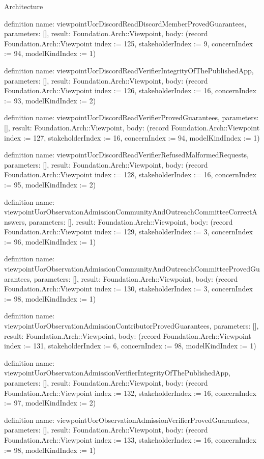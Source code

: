 \begin{lexlean}{Architecture}
\begin{semanticmodule}
definition{
  name: viewpointUorDiscordReadDiscordMemberProvedGuarantees,
  parameters: [],
  result: Foundation.Arch::Viewpoint,
  body: (record Foundation.Arch::Viewpoint {index := 125, stakeholderIndex := 9, concernIndex := 94, modelKindIndex := 1})
}

definition{
  name: viewpointUorDiscordReadVerifierIntegrityOfThePublishedApp,
  parameters: [],
  result: Foundation.Arch::Viewpoint,
  body: (record Foundation.Arch::Viewpoint {index := 126, stakeholderIndex := 16, concernIndex := 93, modelKindIndex := 2})
}

definition{
  name: viewpointUorDiscordReadVerifierProvedGuarantees,
  parameters: [],
  result: Foundation.Arch::Viewpoint,
  body: (record Foundation.Arch::Viewpoint {index := 127, stakeholderIndex := 16, concernIndex := 94, modelKindIndex := 1})
}

definition{
  name: viewpointUorDiscordReadVerifierRefusedMalformedRequests,
  parameters: [],
  result: Foundation.Arch::Viewpoint,
  body: (record Foundation.Arch::Viewpoint {index := 128, stakeholderIndex := 16, concernIndex := 95, modelKindIndex := 2})
}

definition{
  name: viewpointUorObservationAdmissionCommunityAndOutreachCommitteeCorrectAnswers,
  parameters: [],
  result: Foundation.Arch::Viewpoint,
  body: (record Foundation.Arch::Viewpoint {index := 129, stakeholderIndex := 3, concernIndex := 96, modelKindIndex := 1})
}

definition{
  name: viewpointUorObservationAdmissionCommunityAndOutreachCommitteeProvedGuarantees,
  parameters: [],
  result: Foundation.Arch::Viewpoint,
  body: (record Foundation.Arch::Viewpoint {index := 130, stakeholderIndex := 3, concernIndex := 98, modelKindIndex := 1})
}

definition{
  name: viewpointUorObservationAdmissionContributorProvedGuarantees,
  parameters: [],
  result: Foundation.Arch::Viewpoint,
  body: (record Foundation.Arch::Viewpoint {index := 131, stakeholderIndex := 6, concernIndex := 98, modelKindIndex := 1})
}

definition{
  name: viewpointUorObservationAdmissionVerifierIntegrityOfThePublishedApp,
  parameters: [],
  result: Foundation.Arch::Viewpoint,
  body: (record Foundation.Arch::Viewpoint {index := 132, stakeholderIndex := 16, concernIndex := 97, modelKindIndex := 2})
}

definition{
  name: viewpointUorObservationAdmissionVerifierProvedGuarantees,
  parameters: [],
  result: Foundation.Arch::Viewpoint,
  body: (record Foundation.Arch::Viewpoint {index := 133, stakeholderIndex := 16, concernIndex := 98, modelKindIndex := 1})
}


\end{semanticmodule}
\end{lexlean}
